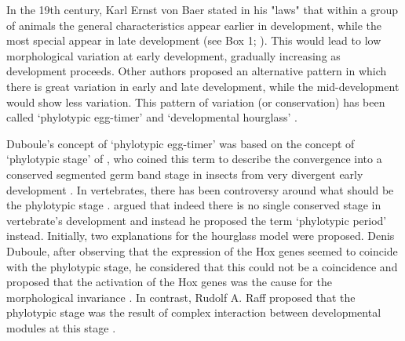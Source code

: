 
%
%
%

\label{hourglass}

In the 19th century, Karl Ernst von Baer stated in his "laws" that within a group of animals the general characteristics appear earlier in development, while the most special appear in late development (see Box 1; \citealp{vonBaer1828uber}).
This would lead to low morphological variation at early development, gradually increasing as development proceeds.
%
Other authors \citep{Medawar1954,Slack1993,Duboule1994,Raff1996} proposed an alternative pattern in which there is great variation in early and late development, while the mid-development would show less variation.
This pattern of variation (or conservation) has been called `phylotypic egg-timer' \citep{Duboule1994} and `developmental hourglass' \citep{Raff1996}.

Duboule's concept of `phylotypic egg-timer' was based on the concept of `phylotypic stage' of \citet{Sander1983}, who coined this term to describe the convergence into a conserved segmented germ band stage in insects from very divergent early development \citep{Sander1996}.
In vertebrates, there has been controversy around what should be the phylotypic stage \citep{Ballard1981,Slack1993,Duboule1994}. \citet{Richardson1995} argued that indeed there is no single conserved stage in vertebrate's development and instead he proposed the term `phylotypic period' instead.
%
Initially, two explanations for the hourglass model were proposed.
Denis Duboule, after observing that the expression of the Hox genes seemed to coincide with the phylotypic stage, he considered that this could not be a coincidence and proposed that the activation of the Hox genes was the cause for the morphological invariance \citep{Duboule1994}.
In contrast, Rudolf A. Raff proposed that the phylotypic stage was the result of complex interaction between developmental modules at this stage \citep{Raff1996}.

